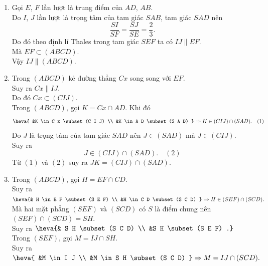 \begin{bt}
{\begin{enumerate}
			Vậy $(SAB)\cap (ABCD)=AB$.
			\item Gọi $E$, $F$ lần lượt là trung điểm của $AD$, $AB$.\\
			Do $I$, $J$ lần lượt là trọng tâm của tam giác $SAB$, tam giác $SAD$ nên
			$$\dfrac{SI}{SF}=\dfrac{SJ}{SE}=\dfrac{2}{3}.$$
			Do đó theo định lí Thales trong tam giác $SEF$ ta có $IJ \parallel EF$.\\
			Mà $EF\subset (ABCD)$.\\
			Vậy $IJ\parallel (ABCD)$.
			\item Trong $(A B C D)$ kẻ đường thẳng $C x$ song song với $E F$.\\
			Suy ra $C x \parallel I J$.\\
			Do đó $C x \subset(C I J)$.\\
			Trong  $(A B C D)$, gọi $K=C x \cap A D$.
			Khi đó $$\heva{
				&K \in C x \subset(C I J) \\
				&K \in A D \subset(S A D)
			} \Rightarrow K \in(C I J) \cap(S A D).\quad (1)
			$$
			Do $J$ là trọng tâm của tam giác $SAD$ nên $J \in(S A D)$ mà $J \in(C I J)$.\\
			Suy ra 
			$$ J \in(C I J) \cap(S A D).\quad(2)$$
			Từ $(1)$ và $(2)$ suy ra $J K=(C I J) \cap(S A D)$.
			\item Trong $(A B C D)$,   gọi $H=E F \cap C D$. \\
			Suy ra $\heva{&
				H \in E F \subset(S E F) \\
				&H \in C D \subset(S C D)
			} \Rightarrow H \in(S E F) \cap(S C D).$\\
			Mà hai mặt phẳng $(S E F)$ và $(S C D)$ có  $S $ là điểm chung nên $(S E F) \cap(S C D)=S H$. \\
			Suy ra $\heva{&
				S H \subset(S C D) \\
				&S H \subset(S E F)
				.}$\\
			Trong $(SEF)$, gọi $M=I J \cap S H$. \\
			Suy ra $\heva{
				&M \in I J \\
				&M \in S H \subset(S C D)
			} \Rightarrow M=I J \cap(S C D).$
		\end{enumerate}
	}
\end{bt}


